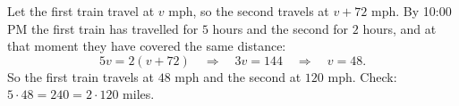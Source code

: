 Let the first train travel at $v$ mph, so the second travels at $v+72$ mph. By 10:00 PM the first train has travelled for $5$ hours and the second for $2$ hours, and at that moment they have covered the same distance:
\[
5v=2(v+72)\quad\Longrightarrow\quad 3v=144\quad\Longrightarrow\quad v=48 .
\]
So the first train travels at $\boxed{48\text{ mph}}$ and the second at $\boxed{120\text{ mph}}$. Check: $5\cdot48=240=2\cdot120$ miles.
